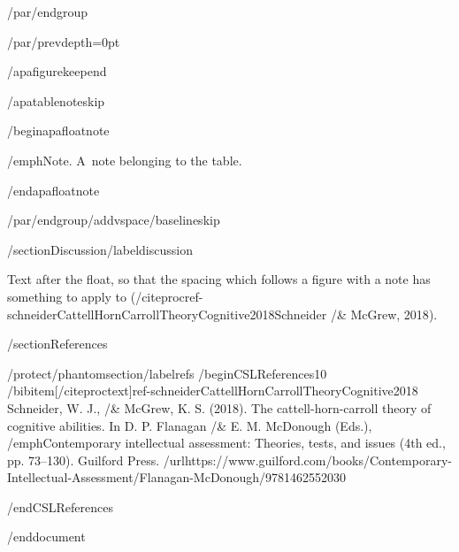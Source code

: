 /par/endgroup

/par/prevdepth=0pt

/apafigurekeepend

/apatablenoteskip

/begin{apafloatnote}

/emph{Note}. A~note belonging to the table.

/end{apafloatnote}

/par/endgroup/addvspace{/baselineskip}

/section{Discussion}/label{discussion}

Text after the float, so that the spacing which follows a figure with a
note has something to apply to
(/citeproc{ref-schneiderCattellHornCarrollTheoryCognitive2018}{Schneider
/& McGrew, 2018}).

/section{References}

/protect/phantomsection/label{refs}
/begin{CSLReferences}{1}{0}
/bibitem[/citeproctext]{ref-schneiderCattellHornCarrollTheoryCognitive2018}
Schneider, W. J., /& McGrew, K. S. (2018). The cattell-horn-carroll
theory of cognitive abilities. In D. P. Flanagan /& E. M. McDonough
(Eds.), /emph{Contemporary intellectual assessment: Theories, tests, and
issues} (4th ed., pp. 73--130). Guilford Press.
/url{https://www.guilford.com/books/Contemporary-Intellectual-Assessment/Flanagan-McDonough/9781462552030}

/end{CSLReferences}




/end{document}
